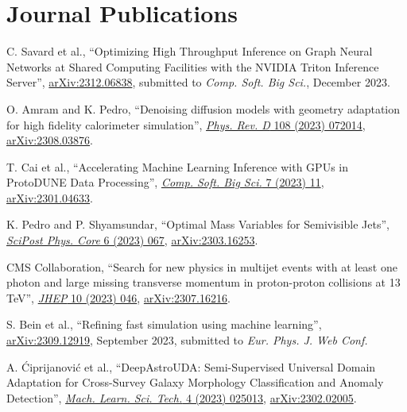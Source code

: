 \section{Journal Publications}
\begin{description}[leftmargin=12pt,font=\normalfont,labelsep=0em]
\item C. Savard et al., ``Optimizing High Throughput Inference on Graph Neural Networks at Shared Computing Facilities with the NVIDIA Triton Inference Server'', \href{https://arxiv.org/abs/2312.06838}{arXiv:2312.06838}, submitted to \emph{Comp. Soft. Big Sci.}, December 2023. %
\item O. Amram and K. Pedro, ``Denoising diffusion models with geometry adaptation for high fidelity calorimeter simulation'', \href{https://doi.org/10.1103/PhysRevD.108.072014}{\emph{Phys. Rev. D} 108 (2023) 072014}, \href{https://arxiv.org/abs/2308.03876}{arXiv:2308.03876}. %
\item T. Cai et al., ``Accelerating Machine Learning Inference with GPUs in ProtoDUNE Data Processing'', \href{https://doi.org/10.1007/s41781-023-00101-0}{\emph{Comp. Soft. Big Sci.} 7 (2023) 11}, \href{https://arxiv.org/abs/2301.04633}{arXiv:2301.04633}. %
\item \begin{sloppypar}K. Pedro and P. Shyamsundar, ``Optimal Mass Variables for Semivisible Jets'', \href{https://doi.org/10.21468/SciPostPhysCore.6.4.067}{\emph{SciPost Phys. Core} 6 (2023) 067}, \href{https://arxiv.org/abs/2303.16253}{arXiv:2303.16253}.\end{sloppypar} %
\item CMS Collaboration, ``Search for new physics in multijet events with at least one photon and large missing transverse momentum in proton-proton collisions at 13 TeV'', \href{https://doi.org/10.1007/JHEP10(2023)046}{\emph{JHEP} 10 (2023) 046}, \href{https://arxiv.org/abs/2307.16216}{arXiv:2307.16216}. %
\item S. Bein et al., ``Refining fast simulation using machine learning'', \href{https://arxiv.org/abs/2309.12919}{arXiv:2309.12919}, September 2023, submitted to \emph{Eur. Phys. J. Web Conf.} %
\item A. \'Ciprijanovi\'c et al., ``DeepAstroUDA: Semi-Supervised Universal Domain Adaptation for Cross-Survey Galaxy Morphology Classification and Anomaly Detection'', \href{https://doi.org/10.1088/2632-2153/acca5f}{\emph{Mach. Learn. Sci. Tech.} 4 (2023) 025013}, \href{https://arxiv.org/abs/2302.02005}{arXiv:2302.02005}. %

\end{description}
